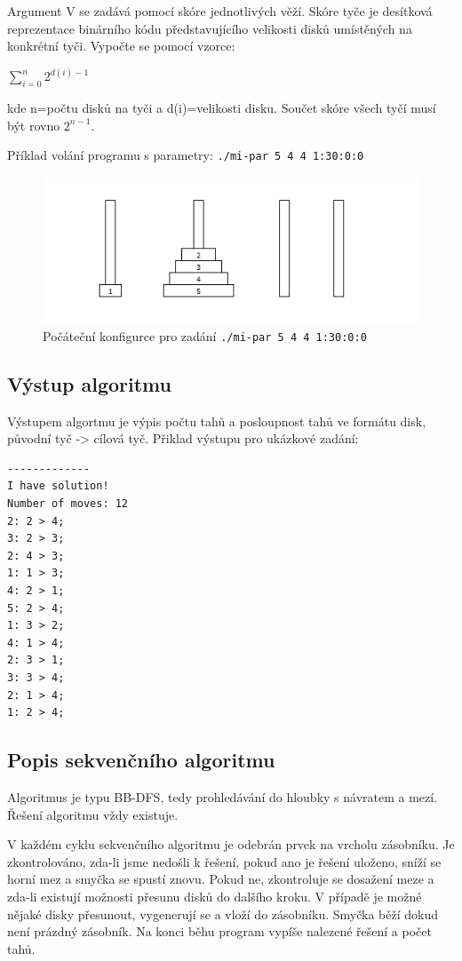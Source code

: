 \documentclass[12pt]{article}
\begin{document}
Argument V se zadává pomocí skóre jednotlivých věží. Skóre tyče je desítková reprezentace binárního kódu představujícího velikosti disků umístěných na konkrétní tyči. Vypočte se pomocí vzorce:
\begin{center}
$\displaystyle\sum\limits_{i=0}^n {2^{d(i)-1}}$
\end{center}
 kde n=počtu disků na tyči a d(i)=velikosti disku. Součet skóre všech tyčí musí být rovno $2^{n-1}$.

Příklad volání programu s parametry:
\texttt{./mi-par 5 4 4 1:30:0:0}

\begin{figure}[h]
\begin{center}
\includegraphics[width=140mm]{5-4-4.png}
\caption{Počáteční konfigurce pro zadání \texttt{./mi-par 5 4 4 1:30:0:0}}
\end{center}
\end{figure}



\subsection{Výstup algoritmu}
Výstupem algortmu je výpis počtu tahů a posloupnost tahů ve formátu disk, původní tyč -> cílová tyč.
Přiklad výstupu pro ukázkové zadání:

\begin{verbatim}
-------------
I have solution!
Number of moves: 12
2: 2 > 4;
3: 2 > 3;
2: 4 > 3;
1: 1 > 3;
4: 2 > 1;
5: 2 > 4;
1: 3 > 2;
4: 1 > 4;
2: 3 > 1;
3: 3 > 4;
2: 1 > 4;
1: 2 > 4;
\end{verbatim}
\subsection{Popis sekvenčního algoritmu}
Algoritmus je typu BB-DFS, tedy prohledávání do hloubky s návratem a mezí. Řešení algoritmu vždy existuje. 

V každém cyklu sekvenčního algoritmu je odebrán prvek na vrcholu zásobníku. Je zkontrolováno, zda-li jsme nedošli k řešení, pokud ano je řešení uloženo, sníží se horní mez a smyčka se spustí znovu. Pokud ne, zkontroluje se dosažení meze a zda-li existují možnosti přesunu disků do dalšího kroku. V případě je možné nějaké disky přesunout, vygenerují se  a vloží do zásobníku. Smyčka běží dokud není prázdný zásobník. Na konci běhu program vypíše nalezené řešení a počet tahů.
\end{document}
